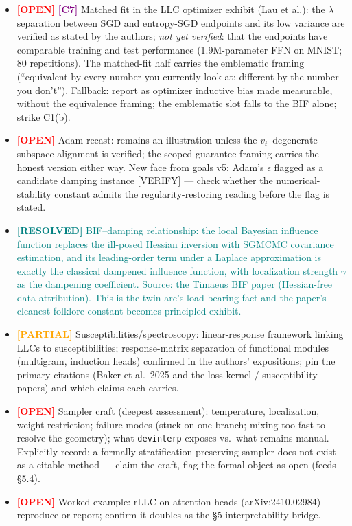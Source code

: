 \documentclass[11pt]{article}
\newcommand{\resolved}[1]{\textcolor{teal}{\textbf{[RESOLVED]} #1}}
\newcommand{\open}{\textcolor{red}{\textbf{[OPEN]}} }
\newcommand{\partialr}{\textcolor{orange}{\textbf{[PARTIAL]}} }
\newcommand{\cref}[1]{\textcolor{purple}{\textbf{[#1]}} }
\begin{document}
\begin{itemize}[itemsep=4pt]
wrong.''
\item \open \cref{C7} Matched fit in the LLC optimizer exhibit (Lau et
al.): the $\lambda$ separation between SGD and entropy-SGD endpoints and
its low variance are verified as stated by the authors; \emph{not yet
verified}: that the endpoints have comparable training and test
performance (1.9M-parameter FFN on MNIST; 80 repetitions). The
matched-fit half carries the emblematic framing (``equivalent by every
number you currently look at; different by the number you don't'').
Fallback: report as optimizer inductive bias made measurable, without
the equivalence framing; the emblematic slot falls to the BIF alone;
strike C1(b).
\item \open Adam recast: remains an illustration unless the
$v_t$--degenerate-subspace alignment is verified; the scoped-guarantee
framing carries the honest version either way. New face from goals v5:
Adam's $\epsilon$ flagged as a candidate damping instance [VERIFY] ---
check whether the numerical-stability constant admits the
regularity-restoring reading before the flag is stated.
\item \resolved{BIF--damping relationship: the local Bayesian influence
function replaces the ill-posed Hessian inversion with SGMCMC covariance
estimation, and its leading-order term under a Laplace approximation is
exactly the classical dampened influence function, with localization
strength $\gamma$ as the dampening coefficient. Source: the Timaeus BIF
paper (Hessian-free data attribution). This is the twin arc's
load-bearing fact and the paper's cleanest
folklore-constant-becomes-principled exhibit.}
\item \partialr Susceptibilities/spectroscopy: linear-response framework
linking LLCs to susceptibilities; response-matrix separation of
functional modules (multigram, induction heads) confirmed in the
authors' expositions; pin the primary citations (Baker et al.\ 2025 and
the loss kernel / susceptibility papers) and which claims each carries.
\item \open Sampler craft (deepest assessment): temperature,
localization, weight restriction; failure modes (stuck on one branch;
mixing too fast to resolve the geometry); what \texttt{devinterp}
exposes vs.\ what remains manual. Explicitly record: a formally
stratification-preserving sampler does not exist as a citable method ---
claim the craft, flag the formal object as open (feeds \S5.4).
\item \open Worked example: rLLC on attention heads (arXiv:2410.02984)
--- reproduce or report; confirm it doubles as the \S5 interpretability
bridge.
\end{itemize}
\end{document}
